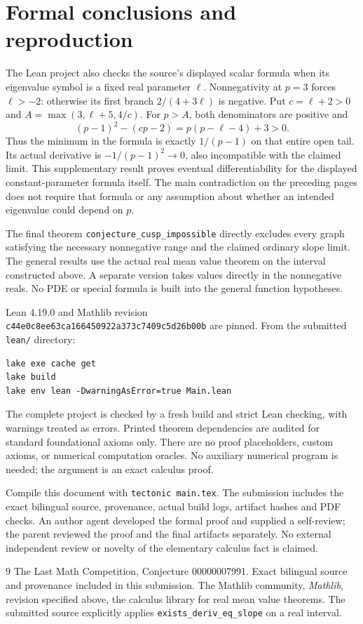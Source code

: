 \documentclass[11pt]{article}
\begin{document}
\section*{Formal conclusions and reproduction}
The Lean project also checks the source's displayed scalar formula
when its eigenvalue symbol is a fixed real parameter $\ell$.
Nonnegativity at $p=3$ forces $\ell>-2$: otherwise its first
branch $2/(4+3\ell)$ is negative.
Put $c=\ell+2>0$ and
$A=\max(3,\ell+5,4/c)$. For $p>A$, both denominators
are positive and
\[
 (p-1)^2-(cp-2)=p(p-\ell-4)+3>0.
\]
Thus the minimum in the formula is exactly $1/(p-1)$
on that entire open tail. Its actual derivative is
$-1/(p-1)^2\to0$, also incompatible with the claimed
limit. This supplementary result proves eventual
differentiability for the displayed constant-parameter
formula itself. The main contradiction on the preceding
pages does not require that formula or any assumption
about whether an intended eigenvalue could depend on $p$.

The final theorem \texttt{conjecture\_cusp\_impossible}
directly excludes every graph satisfying the necessary
nonnegative range and the claimed ordinary slope limit.
The general results use the actual real mean value theorem
on the interval constructed above. A separate version takes
values directly in the nonnegative reals. No PDE or special
formula is built into the general function hypotheses.

Lean 4.19.0 and Mathlib revision\\
\texttt{c44e0c8ee63ca166450922a373c7409c5d26b00b}
are pinned. From the submitted \texttt{lean/} directory:
\begin{verbatim}
lake exe cache get
lake build
lake env lean -DwarningAsError=true Main.lean
\end{verbatim}
The complete project is checked by a fresh build and strict
Lean checking, with warnings treated as errors. Printed
theorem dependencies are audited for standard foundational
axioms only. There are no proof placeholders, custom axioms,
or numerical computation oracles. No auxiliary numerical
program is needed; the argument is an exact calculus proof.

Compile this document with \texttt{tectonic main.tex}.
The submission includes the exact bilingual source,
provenance, actual build logs, artifact hashes and PDF
checks. An author agent developed the formal proof and
supplied a self-review; the parent reviewed the proof and
the final artifacts separately. No external independent
review or novelty of the elementary calculus fact is claimed.

\begin{thebibliography}{9}
 The Last Math Competition,
Conjecture 00000007991. Exact bilingual source and
provenance included in this submission.
 The Mathlib community,
\emph{Mathlib}, revision specified above,
the calculus library for real mean value theorems.
The submitted source explicitly applies
\texttt{exists\_deriv\_eq\_slope} on a real interval.
\end{thebibliography}
\end{document}
